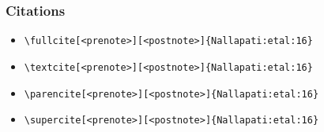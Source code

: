 \begin{frame}[fragile]
  \frametitle{Citations}


\begin{itemize}
\item \verb|\fullcite[<prenote>][<postnote>]{Nallapati:etal:16}| \newline  {}
\item \verb|\textcite[<prenote>][<postnote>]{Nallapati:etal:16}| \newline \textcite[<prenote>][<postnote>]{Nallapati:etal:16}
\item \verb|\parencite[<prenote>][<postnote>]{Nallapati:etal:16}| \newline \parencite[<prenote>][<postnote>]{Nallapati:etal:16}
\item \verb|\supercite[<prenote>][<postnote>]{Nallapati:etal:16}| \newline \supercite[<prenote>][<postnote>]{Nallapati:etal:16}

\end{itemize}
\end{frame}
